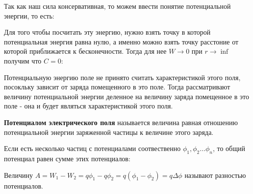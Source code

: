 \documentclass[../main.tex]{subfiles}
\begin{document}

Так как наш сила консервативная, то можем ввести понятие потенциальной энергии, то есть: 



Для того чтобы посчитать эту энергию, нужно взять точку в которой потенциальная энергия равна нулю, а именно можно взять точку расстоние от которой приближается к бесконечности.
Тогда для нее $W \to 0$ при $r \to \inf$ получим что $C = 0$: 


Потенциальную энергию поле не принято считать характеристикой этого поля, посокльку зависит от заряда помещенного в это поле. 
Тогда рассматривают величину потенциальной энергии деленное на величину заряда помещенное в это поле - она и будет являться характеристикой этого поля.

 \textbf{Потенциалом электрического поля} называется величина равная отношению потенциальной энергии заряженной частицы к величине этого заряда.

Если есть несколько частиц с потенциалами соотвественно $\phi_1, \phi_2 \ldots \phi_n$, то общий потенциал равен сумме этих потенциалов:


 Величину $A = W_1 - W_2 = q\phi_1 - q\phi_2 = q(\phi_1 - \phi_2) = q\Delta \phi$ называют разностью потенциалов.
\end{document}

